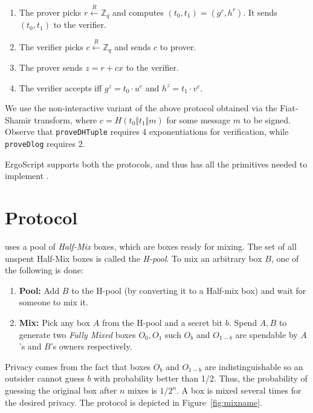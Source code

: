 \documentclass[runningheads]{llncs}
\newcommand{\langname}{ErgoScript\xspace}
\begin{document}
\begin{enumerate}
	\item The prover picks $r \stackrel{R}{\leftarrow} \mathbb{Z}_q$ and computes $(t_0, t_1) = ({g}^r, {h}^r)$. It sends $(t_0, t_1)$ to the verifier.
	\item The verifier picks $c \stackrel{R}{\leftarrow} \mathbb{Z}_q$ and sends $c$ to prover.
	\item The prover sends $z = r + cx$ to the verifier. 
	\item The verifier accepts iff ${g}^z = {t_0}\cdot {u}^c$ and $h^z=t_1\cdot v^c$.
\end{enumerate}

We use the non-interactive variant of the above protocol obtained via the Fiat-Shamir transform, where $c = H(t_0 \Vert t_1\Vert m)$ for some message $m$ to be signed.  Observe that \texttt{proveDHTuple} requires 4 exponentiations for verification, while \texttt{proveDlog} requires 2. 

\langname supports both the protocols, and thus has all the primitives needed to implement \algname.

\section{\algname Protocol}

\algname uses a pool of {\em Half-Mix} boxes, which are boxes ready for mixing. The set of all unspent Half-Mix boxes is called the {\em H-pool}. To mix an arbitrary box $B$, one of the following is done:
\begin{enumerate}
	\item \textbf{Pool:} Add $B$ to the H-pool (by converting it to a Half-mix box) and wait for someone to mix it.
	\item \textbf{Mix:} Pick any box $A$ from the H-pool and a secret bit $b$. Spend $A, B$ to generate two {\em Fully Mixed} boxes $O_0, O_1$ such $O_b$ and $O_{1-b}$ are spendable by $A$'s and $B$'s owners respectively.
\end{enumerate}

Privacy comes from the fact that boxes $O_b$ and $O_{1-b}$ are indistinguishable so an outsider cannot guess $b$ with probability better than 1/2. Thus, the probability of guessing the original box after $n$ mixes is $1/2^n$. A box is mixed several times for the desired privacy. The protocol is depicted in Figure~\ref{fig:mixname}. 
\end{document}
